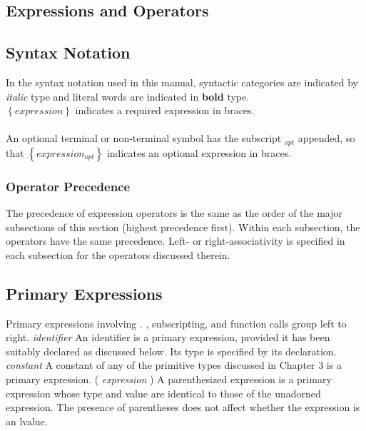 \begin{homeworkProblem}
	\section{Expressions and Operators}
	\subsection{Syntax Notation}
	In the syntax notation used in this manual, syntactic categories are indicated by \textit{italic} type and literal words are indicated in \textbf{bold} type.\\
	\textit{ $\left\{ expression \right\}$ }
	indicates a required expression in braces.
	\\
	\\
	An optional terminal or non-terminal symbol has the subscript $_{opt}$ appended, so that
	\textit{ $\left\{ expression_{opt}\right\}$ }
	indicates an optional expression in braces.
	
	\subsubsection{Operator Precedence}
	The precedence of expression operators is the same as the order of the major subsections of this section (highest precedence first). Within each subsection, the operators have the same precedence. Left- or right-associativity is specified in each subsection for the operators discussed therein.
	\subsection{Primary Expressions}
	Primary expressions involving . , subscripting, and function calls group left to right.
	\newline	
	\newline
	\textit{identifier}
	\newline
	An identifier is a primary expression, provided it has been suitably declared as discussed below. Its type is specified by its declaration.
	\newline
	\newline
	\textit{constant}
	\newline
	A constant of any of the primitive types discussed in Chapter 3 is a primary expression.
	\newline
	\newline
	( \textit{expression} )
	\newline
	A parenthesized expression is a primary expression whose type and value are identical to those of the unadorned expression. The presence of parentheses does not affect whether the expression is an lvalue.
	

\end{homeworkProblem}
